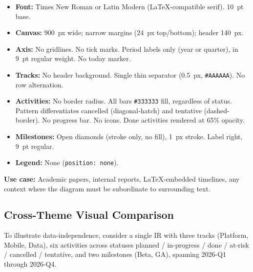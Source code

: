 \begin{itemize}
  \item \textbf{Font:} Times New Roman or Latin Modern (LaTeX-compatible serif). 10~pt base.
  \item \textbf{Canvas:} 900~px wide; narrow margins (24~px top/bottom); header 140~px.
  \item \textbf{Axis:} No gridlines. No tick marks. Period labels only (year or quarter),
        in 9~pt regular weight. No today marker.
  \item \textbf{Tracks:} No header background. Single thin separator (0.5~px,
        \texttt{\#AAAAAA}). No row alternation.
  \item \textbf{Activities:} No border radius. All bars \texttt{\#333333} fill, regardless
        of status. Pattern differentiates cancelled (diagonal-hatch) and tentative
        (dashed-border). No progress bar. No icons. Done activities rendered at 65\% opacity.
  \item \textbf{Milestones:} Open diamonds (stroke only, no fill), 1~px stroke. Label right,
        9~pt regular.
  \item \textbf{Legend:} None (\texttt{position: none}).
\end{itemize}

\textbf{Use case:} Academic papers, internal reports, LaTeX-embedded timelines, any context
where the diagram must be subordinate to surrounding text.

\subsection{Cross-Theme Visual Comparison}
\label{sec:theme-comparison}

To illustrate data-independence, consider a single IR with three tracks (Platform, Mobile,
Data), six activities across statuses planned / in-progress / done / at-risk / cancelled /
tentative, and two milestones (Beta, GA), spanning 2026-Q1 through 2026-Q4.

